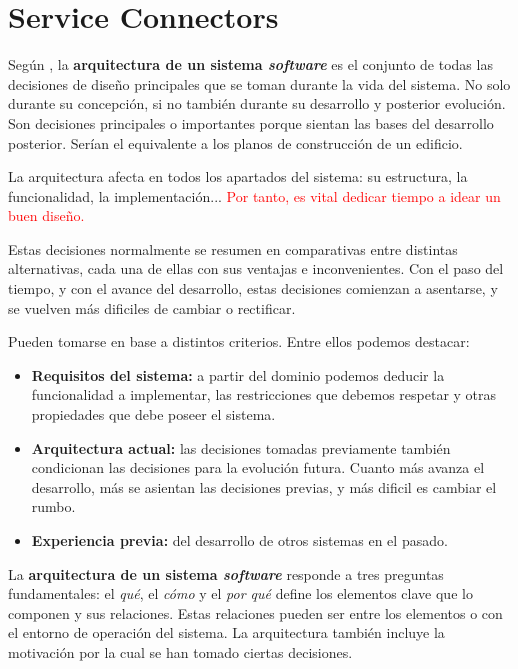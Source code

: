 \chapter{Service Connectors}

Según \cite{SoftwareArchitectureFoundations}, la {\bf arquitectura de un sistema \textit{software}} es el conjunto de todas las decisiones de diseño principales que se toman durante la vida del sistema. No solo durante su concepción, si no también durante su desarrollo y posterior evolución. Son decisiones principales o importantes porque sientan las bases del desarrollo posterior. Serían el equivalente a los planos de construcción de un edificio.

La arquitectura afecta en todos los apartados del sistema: su estructura, la funcionalidad, la implementación... \textcolor{red}{Por tanto, es vital dedicar tiempo a idear un buen diseño.}

Estas decisiones normalmente se resumen en comparativas entre distintas alternativas, cada una de ellas con sus ventajas e inconvenientes. Con el paso del tiempo, y con el avance del desarrollo, estas decisiones comienzan a asentarse, y se vuelven más dificiles de cambiar o rectificar.

Pueden tomarse en base a distintos criterios. Entre ellos podemos destacar:

    \begin{itemize}
        \item \textbf{Requisitos del sistema:} a partir del dominio podemos deducir la funcionalidad a implementar, las restricciones que debemos respetar y otras propiedades que debe poseer el sistema.
        \item \textbf{Arquitectura actual:} las decisiones tomadas previamente también condicionan las decisiones para la evolución futura. Cuanto más avanza el desarrollo, más se asientan las decisiones previas, y más dificil es cambiar el rumbo.
        \item \textbf{Experiencia previa:} del desarrollo de otros sistemas en el pasado.
    \end{itemize} 

La {\bf arquitectura de un sistema \textit{software}} responde a tres preguntas fundamentales: el \textit{qué}, el \textit{cómo} y el \textit{por qué} define los elementos clave que lo componen y sus relaciones. Estas relaciones pueden ser entre los elementos o con el entorno de operación del sistema. La arquitectura también incluye la motivación por la cual se han tomado ciertas decisiones. \cite{perryFoundationsStudySoftware1992}

